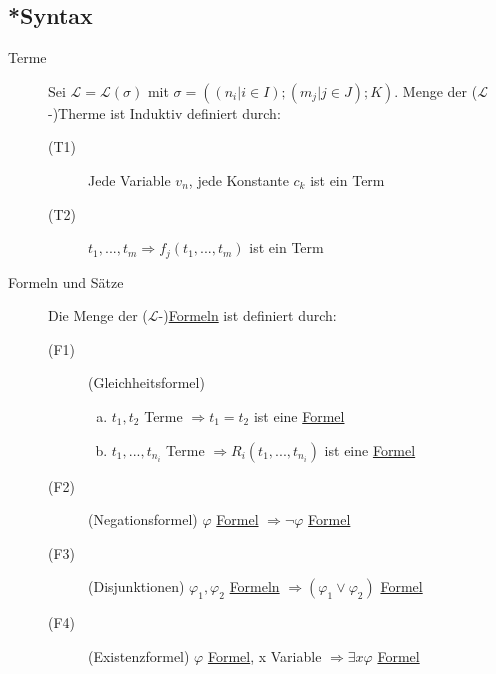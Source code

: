 \documentclass[12pt,a4paper]{article} %
\begin{document}
	\subsection{*Syntax}
	\begin{description}
		\item[Terme] Sei $\mathcal{L} = \mathcal{L}(\sigma)$ mit $\sigma = ((n_i | i \in I); (m_j | j \in J); K)$. Menge der ($\mathcal{L}$-)Therme ist Induktiv definiert durch:
		\begin{description}
			\item[(T1)] Jede Variable $v_n$, jede Konstante $c_k$ ist ein Term
			\item[(T2)] $t_1, ..., t_m \Rightarrow f_j(t_1, ..., t_m)$ ist ein Term
		\end{description}
		\item[Formeln und Sätze]
		Die Menge der ($\mathcal{L}$-)\hyperref[Formel]{Formeln} ist definiert durch:
		
		\begin{description}
			\item[(F1)] (Gleichheitsformel) \begin{enumerate}[(a)]
				\item $t_1, t_2$ Terme $\Rightarrow t_1 = t_2$ ist eine \hyperref[Formel]{Formel}
				\item $t_1, ..., t_{n_i}$ Terme $\Rightarrow R_i(t_1, ..., t_{n_i})$ ist eine \hyperref[Formel]{Formel}
			\end{enumerate}
			\item[(F2)] (Negationsformel) $\varphi$ \hyperref[Formel]{Formel} $\Rightarrow \neg \varphi$ \hyperref[Formel]{Formel}
			\item[(F3)] (Disjunktionen) $\varphi_1, \varphi_2$ \hyperref[Formel]{Formeln} $\Rightarrow (\varphi_1 \lor \varphi_2)$ \hyperref[Formel]{Formel} \\
			\item[(F4)] (Existenzformel) $\varphi$ \hyperref[Formel]{Formel}, x Variable $\Rightarrow \exists x \varphi$ \hyperref[Formel]{Formel}
		\end{description}
	\end{description}
\end{document}

